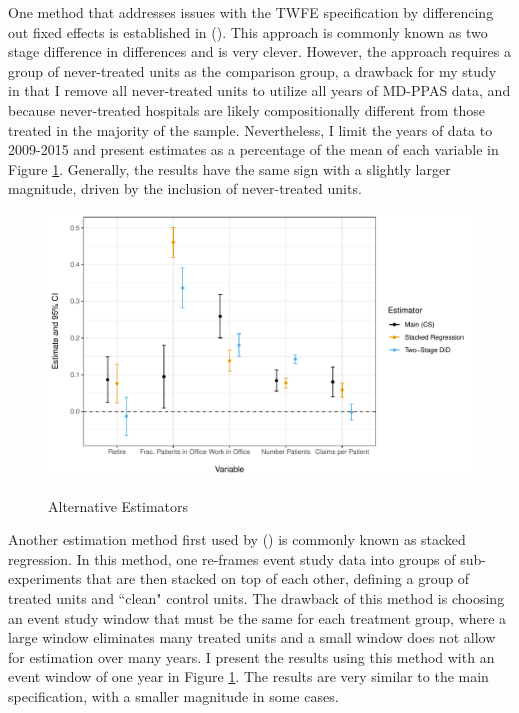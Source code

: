 \documentclass[12pt]{article}
\begin{document}
One method that addresses issues with the TWFE specification by differencing out fixed effects is established in \citeauthor{gardner2021two} (\citeyear{gardner2021two}). This approach is commonly known as two stage difference in differences and is very clever. However, the approach requires a group of never-treated units as the comparison group, a drawback for my study in that I remove all never-treated units to utilize all years of MD-PPAS data, and because never-treated hospitals are likely compositionally different from those treated in the majority of the sample. Nevertheless, I limit the years of data to 2009-2015 and present estimates as a percentage of the mean of each variable in Figure \ref{fig:estimators}. Generally, the results have the same sign with a slightly larger magnitude, driven by the inclusion of never-treated units. 

\begin{figure}
    \centering
    \caption{Alternative Estimators}
    \includegraphics[scale=.6]{Objects/estimators_plot.pdf}
    \label{fig:estimators}
\end{figure}

Another estimation method first used by \citeauthor{cengiz2019effect} (\citeyear{cengiz2019effect}) is commonly known as stacked regression. In this method, one re-frames event study data into groups of sub-experiments that are then stacked on top of each other, defining a group of treated units and ``clean" control units. The drawback of this method is choosing an event study window that must be the same for each treatment group, where a large window eliminates many treated units and a small window does not allow for estimation over many years. I present the results using this method with an event window of one year in Figure \ref{fig:estimators}. The results are very similar to the main specification, with a smaller magnitude in some cases. 
\end{document}
